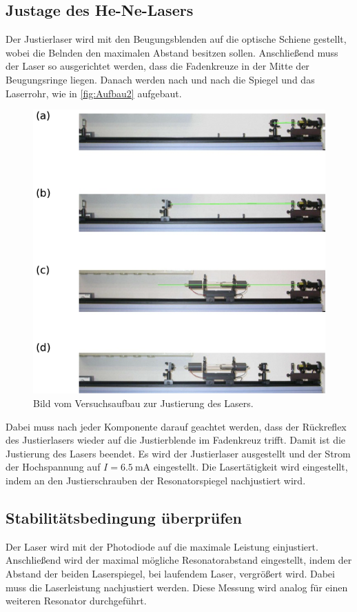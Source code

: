 \subsection{Justage des He-Ne-Lasers}
\label{subsec:Justage}
Der Justierlaser wird mit den Beugungsblenden auf die optische Schiene gestellt, wobei die Belnden den maximalen Abstand besitzen sollen.
Anschließend muss der Laser so ausgerichtet werden, dass die Fadenkreuze in der Mitte der Beugungsringe liegen.
Danach werden nach und nach die Spiegel und das Laserrohr, wie in \autoref{fig:Aufbau2} aufgebaut.
\begin{figure}[H]
    \centering
    \includegraphics[scale=0.7]{Abbildungen/Aufbau2.png}
    \caption{Bild vom Versuchsaufbau zur Justierung des Lasers.\cite{V61}}
    \label{fig:Aufbau2}
\end{figure}
Dabei muss nach jeder Komponente darauf geachtet werden, dass der Rückreflex des Justierlasers wieder auf die Justierblende im Fadenkreuz trifft.
Damit ist die Justierung des Lasers beendet. Es wird der Justierlaser ausgestellt und der Strom der Hochspannung
auf $I = \qty{6.5}{\milli\A}$ eingestellt. Die Lasertätigkeit wird eingestellt, indem an den Justierschrauben der Resonatorspiegel nachjustiert wird.

\subsection{Stabilitätsbedingung überprüfen}
\label{subsec:Stabilitätsbedingung}
Der Laser wird mit der Photodiode auf die maximale Leistung einjustiert.
Anschließend wird der maximal mögliche Resonatorabstand eingestellt, indem der Abstand der beiden Laserspiegel, bei laufendem Laser, vergrößert wird.
Dabei muss die Laserleistung nachjustiert werden.
Diese Messung wird analog für einen weiteren Resonator durchgeführt.

